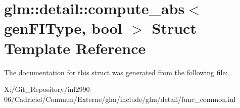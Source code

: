 \hypertarget{structglm_1_1detail_1_1compute__abs}{\section{glm\-:\-:detail\-:\-:compute\-\_\-abs$<$ gen\-F\-I\-Type, bool $>$ Struct Template Reference}
\label{structglm_1_1detail_1_1compute__abs}
}


The documentation for this struct was generated from the following file\-:\begin{DoxyCompactItemize}
\item 
X\-:/\-Git\-\_\-\-Repository/inf2990-\/06/\-Cadriciel/\-Commun/\-Externe/glm/include/glm/detail/func\-\_\-common.\-inl\end{DoxyCompactItemize}
